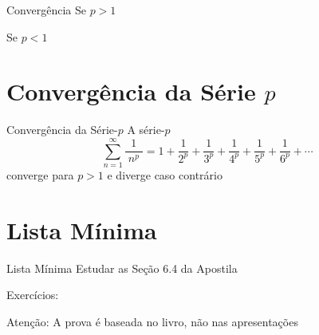 \documentclass[fleqn,utf8,aspectratio=169,12pt]{beamer}
\begin{document}
\begin{resolution}{Convergência}
  Se \emph{$p>1$}

  \vspace{\baselineskip}
  Se \emph{$p<1$}
\end{resolution}

\section{Convergência da Série $p$}
\begin{frame}{Convergência da Série-$p$}
  A série-$p$
  \[
    \sum_{n=1}^\infty\frac{1}{\;n^p\;}
    = 1
    + \frac{1}{2^p}
    + \frac{1}{3^p}
    + \frac{1}{4^p}
    + \frac{1}{5^p}
    + \frac{1}{6^p}
    + \cdots
  \]
  converge para $p>1$ e diverge caso contrário
\end{frame}

\section{Lista Mínima}

\begin{frame}{Lista Mínima}
  Estudar as Seção 6.4 da Apostila

  \vspace{\baselineskip}
  Exercícios:

  \vfill
  Atenção: A prova é baseada no livro, não nas apresentações
\end{frame}

\end{document}
